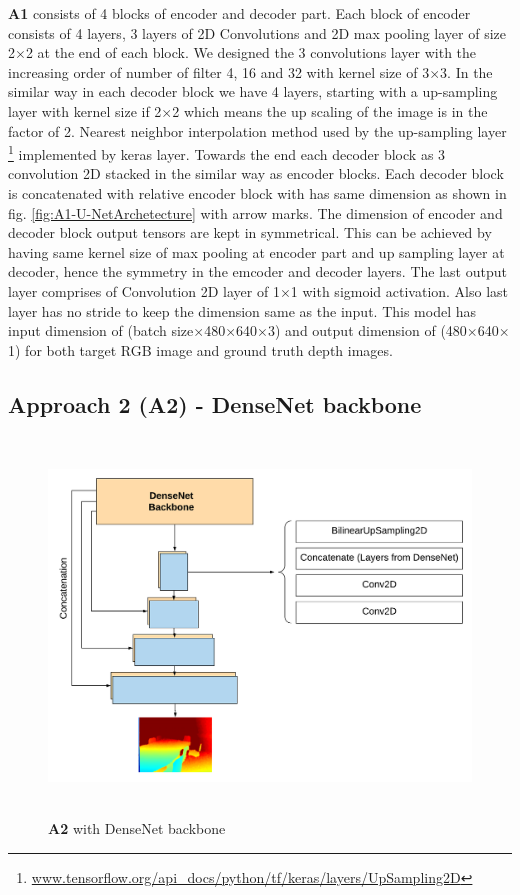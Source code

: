 \textbf{A1} consists of 4 blocks of encoder and decoder part. Each block of encoder consists of 4 layers, 3 layers of 2D Convolutions and 2D max pooling layer of size 2$\times$2 at the end of each block. We designed the 3 convolutions layer with the increasing order of number of filter 4, 16 and 32 with kernel size of 3$\times$3. In the similar way in each decoder block we have 4 layers, starting with a up-sampling layer with kernel size if 2$\times$2 which means the up scaling of the image is in the factor of 2. Nearest neighbor interpolation method used by the up-sampling layer \footnote{\url{www.tensorflow.org/api_docs/python/tf/keras/layers/UpSampling2D}} implemented by keras layer. Towards the end each decoder block as 3 convolution 2D stacked in the similar way as encoder blocks. Each decoder block is concatenated with relative encoder block with has same dimension as shown in fig. \ref{fig:A1-U-NetArchetecture} with arrow marks. The dimension of encoder and decoder block output tensors are kept in symmetrical. This can be achieved by having same kernel size of max pooling at encoder part and up sampling layer at decoder, hence the symmetry in the emcoder and decoder layers. The last output layer comprises of Convolution 2D layer of 1$\times$1 with sigmoid activation. Also last layer has no stride to keep the dimension same as the input. 
This model has input dimension of (batch size$\times$480$\times$640$\times$3) and output dimension of (480$\times$640$\times$1) for both target RGB image and ground truth depth images.



\subsection{Approach 2 (A2) - DenseNet backbone}

\begin{figure}[h]
    \centering
    \includegraphics[width = 15cm,  height = 10cm]{Figures/A2.png}
    \caption{\textbf{A2} with DenseNet backbone}
    \label{fig:A2-DenseNet-arch}
\end{figure}{}





